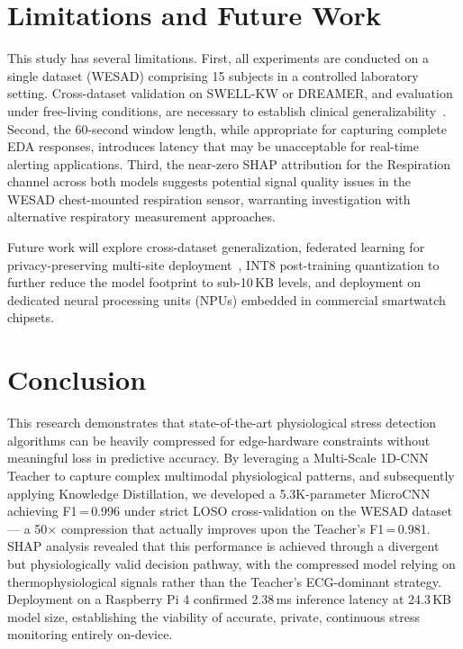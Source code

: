 \documentclass[conference]{IEEEtran}
\begin{document}
\section{Limitations and Future Work}

This study has several limitations. First, all experiments are conducted on a single dataset (WESAD) comprising 15 subjects in a controlled laboratory setting. Cross-dataset validation on SWELL-KW or DREAMER, and evaluation under free-living conditions, are necessary to establish clinical generalizability~\cite{benchekroun2023cross, darwish2025lab}. Second, the 60-second window length, while appropriate for capturing complete EDA responses, introduces latency that may be unacceptable for real-time alerting applications. Third, the near-zero SHAP attribution for the Respiration channel across both models suggests potential signal quality issues in the WESAD chest-mounted respiration sensor, warranting investigation with alternative respiratory measurement approaches.

Future work will explore cross-dataset generalization, federated learning for privacy-preserving multi-site deployment~\cite{almadhor2025cross}, INT8 post-training quantization to further reduce the model footprint to sub-10\,KB levels, and deployment on dedicated neural processing units (NPUs) embedded in commercial smartwatch chipsets.

\section{Conclusion}

This research demonstrates that state-of-the-art physiological stress detection algorithms can be heavily compressed for edge-hardware constraints without meaningful loss in predictive accuracy. By leveraging a Multi-Scale 1D-CNN Teacher to capture complex multimodal physiological patterns, and subsequently applying Knowledge Distillation, we developed a 5.3K-parameter MicroCNN achieving F1\,=\,0.996 under strict LOSO cross-validation on the WESAD dataset --- a 50$\times$ compression that actually improves upon the Teacher's F1\,=\,0.981. SHAP analysis revealed that this performance is achieved through a divergent but physiologically valid decision pathway, with the compressed model relying on thermophysiological signals rather than the Teacher's ECG-dominant strategy. Deployment on a Raspberry Pi 4 confirmed 2.38\,ms inference latency at 24.3\,KB model size, establishing the viability of accurate, private, continuous stress monitoring entirely on-device.

\balance


\end{document}
